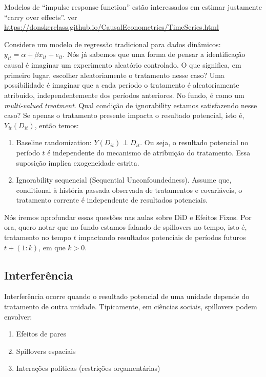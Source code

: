 \documentclass[
]{article}
\begin{document}
Modelos de ``impulse response function'' estão interessados em estimar justamente ``carry over effects''. ver \url{https://donskerclass.github.io/CausalEconometrics/TimeSeries.html}

Considere um modelo de regressão tradicional para dados dinâmicos: \(y_{it} = \alpha + \beta x_{it} + e_{it}\). Nós já sabemos que uma forma de pensar a identificação causal é imaginar um experimento aleatório controlado. O que significa, em primeiro lugar, escolher aleatoriamente o tratamento nesse caso? Uma possibilidade é imaginar que a cada período o tratamento é aleatoriamente atribuído, independentemente dos períodos anteriores. No fundo, é como um \emph{multi-valued treatment}. Qual condição de ignorability estamos satisfazendo nesse caso? Se apenas o tratamento presente impacta o resultado potencial, isto é, \(Y_{it}(D_{it})\), então temos:

\begin{enumerate}
\def\labelenumi{\arabic{enumi}.}
\item
  Baseline randomization: \(Y(D_{it}) \perp D_{it}\). Ou seja, o resultado potencial no período \(t\) é independente do mecanismo de atribuição do tratamento. Essa suposição implica exogeneidade estrita.
\item
  Ignorability sequencial (Sequential Unconfoundedness). Assume que, conditional à história passada observada de tratamentos e covariáveis, o tratamento corrente é independente de resultados potenciais.
\end{enumerate}

Nós iremos aprofundar essas questões nas aulas sobre DiD e Efeitos Fixos. Por ora, quero notar que no fundo estamos falando de spillovers no tempo, isto é, tratamento no tempo \(t\) impactando resultados potenciais de períodos futuros \(t+(1:k)\), em que \(k >0\).

\subsection{Interferência}\label{interferuxeancia}

Interferência ocorre quando o resultado potencial de uma unidade depende do tratamento de outra unidade. Tipicamente, em ciências sociais, spillovers podem envolver:

\begin{enumerate}
\def\labelenumi{\arabic{enumi}.}
\item
  Efeitos de pares
\item
  Spillovers espaciais
\item
  Interações políticas (restrições orçamentárias)
\end{enumerate}
\end{document}
